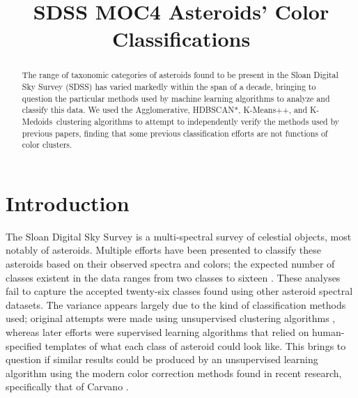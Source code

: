 \documentclass[conference]{IEEEtran}
\def \algorithmsToUse {Agglomerative, HDBSCAN*, K-Means++, and K-Medoids}
\begin{document}
\title{SDSS MOC4 Asteroids' Color Classifications}


\author{
}




\maketitle

\begin{abstract}
The range of taxonomic categories of asteroids found to be present in the Sloan Digital Sky Survey (SDSS) has varied markedly within the span of a decade, bringing to question the particular methods used by machine learning algorithms to analyze and classify this data. We used the \algorithmsToUse  \, clustering algorithms to attempt to independently verify the methods used by previous papers, finding that some previous classification efforts are not functions of color clusters.
\end{abstract}

\IEEEpeerreviewmaketitle

\section{Introduction}
The Sloan Digital Sky Survey is a multi-spectral survey of celestial objects, most notably of asteroids.
Multiple efforts \cite{chapman_classification, zappal_clustering, Carvano, Autoclass} have been presented to classify these asteroids based on their observed spectra and colors; the expected number of classes existent in the data ranges from two classes \cite{Autoclass} to sixteen \cite{Carvano}.
These analyses fail to capture the accepted twenty-six \cite{binzel_classification} classes found using other asteroid spectral datasets.
The variance appears largely due to the kind of classification methods used; original attempts were made using unsupervised clustering algorithms \cite{zappal_clustering, Carvano}, whereas later efforts were supervised learning algorithms that relied on human-specified templates \cite{binzal_colors} of what each class of asteroid could look like.
This brings to question if similar results could be produced by an unsupervised learning algorithm using the modern color correction methods found in recent research, specifically that of Carvano \cite{Carvano}.
\end{document}
